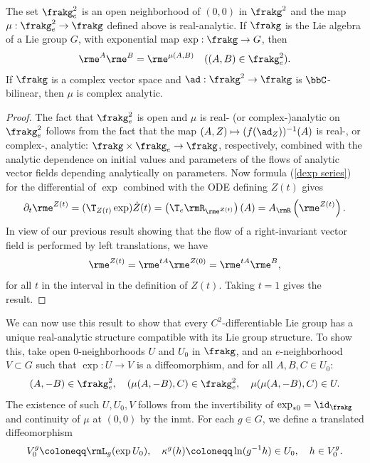 \begin{thm}[{{\cite[Thm.~1.6.1]{DK}}}]
    The set $\frakg_e^2$ is an open neighborhood of $(0,0)$ in $\frakg^2$ and the map $\mu:\frakg_e^2\to \frakg$ defined above is real-analytic. If $\frakg$ is the Lie algebra of a Lie group $G$, with exponential map $\exp:\frakg\to G$, then
    \[\rme^A \rme^B=\rme^{\mu(A,B)}\quad ((A,B)\in\frakg_e^2).\label{eq 1.6.4 DK}\]
    If $\frakg$ is a complex vector space and $\ad:\frakg^2\to \frakg$ is $\bbC$-bilinear, then $\mu$ is complex analytic.
\end{thm}
\begin{proof}
    The fact that $\frakg_e^2$ is open and $\mu$ is real- (or complex-)analytic on $\frakg_e^2$ follows from the fact that the map $(A,Z)\mapsto (f(\ad_Z))^{-1}(A)$ is real-, or complex-, analytic: $\frakg\times\frakg_e\to \frakg$, respectively, combined with the analytic dependence on initial values and parameters of the flows of analytic vector fields depending analytically on parameters. Now formula (\ref{dexp series}) for the differential of $\exp$ combined with the ODE defining $Z(t)$ gives
    \[\partial_t \rme^{Z(t)}=(\T_{Z(t)}\exp )\dot Z(t)=\left(\T_e \rmR_{\rme^{Z(t)}}\right)(A)=A_\rmR\left(\rme^{Z(t)}\right).\label{eq 1.6.5 DK}\]
    In view of our previous result showing that the flow of a right-invariant vector field is performed by left translations, we have
    \[\rme^{Z(t)}=\rme^{tA}\rme^{Z(0)}=\rme^{tA}\rme^B,\label{8284}\]
    for all $t$ in the interval in the definition of $Z(t)$. Taking $t=1$ gives the result.
\end{proof}

We can now use this result to show that every $C^2$-differentiable Lie group has a unique real-analytic structure compatible with its Lie group structure. To show this, take open $0$-neighborhoods $U$ and $U_0$ in $\frakg$, and an $e$-neighborhood $V\subset G$ such that $\exp:U\to V$ is a diffeomorphism, and for all $A,B,C\in U_0$:
\[(A,-B)\in\frakg_e^2,\quad (\mu(A,-B),C)\in\frakg_e^2,\quad \mu(\mu(A,-B),C)\in U.\]
The existence of such $U,U_0,V$ follows from the invertibility of $\exp_{\ast 0}=\id_\frakg$ and continuity of $\mu$ at $(0,0)$ by the \gls{inmt}. For each $g\in G$, we define a translated diffeomorphism
\[V_0^g\coloneqq \rmL_g(\exp U_0),\quad \kappa^g(h)\coloneqq \ln(g^{-1}h)\in U_0,\quad h\in V^g_0.\]

